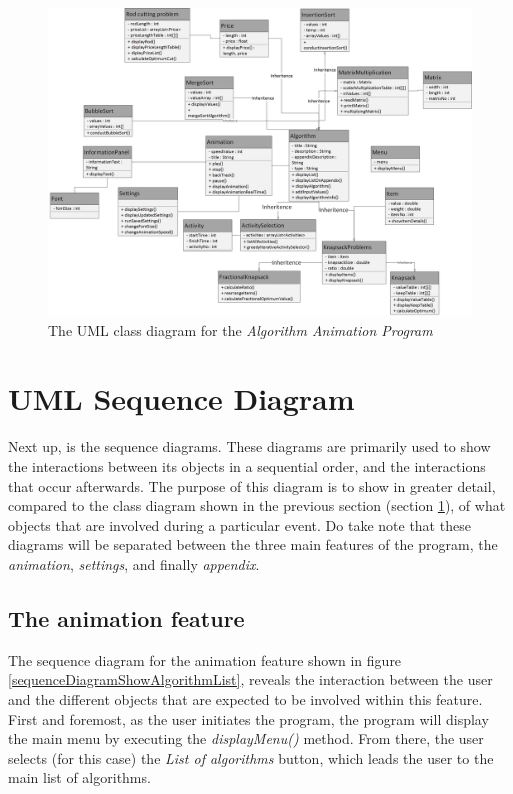 \begin{landscape}
\begin{figure}[H]
\centering
\includegraphics[scale=.37]{images/report_images/UMLClassDiagram.png}
\caption{The UML class diagram for the \textit{Algorithm Animation Program}}
\label{UMLClassDiagram}
\end{figure}
\end{landscape}

\newpage

\section{UML Sequence Diagram}

Next up, is the sequence diagrams. These diagrams are primarily used to show the interactions between its objects in a sequential order, and the interactions that occur afterwards. The purpose of this diagram is to show in greater detail, compared to the class diagram shown in the previous section (section \ref{UMLClassDiagram}), of what objects that are involved during a particular event. Do take note that these diagrams will be separated between the three main features of the program, the \textit{animation}, \textit{settings}, and finally \textit{appendix}.


\subsection{The animation feature}
The sequence diagram for the animation feature shown in figure \ref{sequenceDiagramShowAlgorithmList}, reveals the interaction between the user and the different objects that are expected to be involved within this feature. First and foremost, as the user initiates the program, the program will display the main menu by executing the \textit{displayMenu()} method. From there, the user selects (for this case) the \textit{List of algorithms} button, which leads the user to the main list of algorithms.

